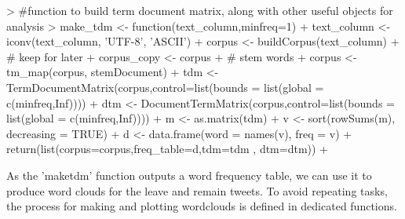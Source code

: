 \documentclass[10pt]{article}
\begin{document}
\begin{Schunk}
\begin{Sinput}
> #function to build term document matrix, along with other useful objects for analysis
> make_tdm <- function(text_column,minfreq=1){
+   text_column <- iconv(text_column, 'UTF-8', 'ASCII')
+   corpus <- buildCorpus(text_column)
+   # keep for later
+   corpus_copy <- corpus
+   # stem words
+   corpus <- tm_map(corpus, stemDocument)
+   tdm <- TermDocumentMatrix(corpus,control=list(bounds = list(global = c(minfreq,Inf)))) 
+   dtm <- DocumentTermMatrix(corpus,control=list(bounds = list(global = c(minfreq,Inf)))) 
+   m <- as.matrix(tdm)
+   v <- sort(rowSums(m), decreasing = TRUE)
+   d <- data.frame(word = names(v), freq = v)
+   return(list(corpus=corpus,freq_table=d,tdm=tdm , dtm=dtm))
+ }
\end{Sinput}
\end{Schunk}
As the 'maketdm' function outputs a word frequency table, we can use it to produce word clouds for the leave and remain tweets. To avoid repeating tasks, the process for making and plotting wordclouds is defined in dedicated functions.
\end{document}
